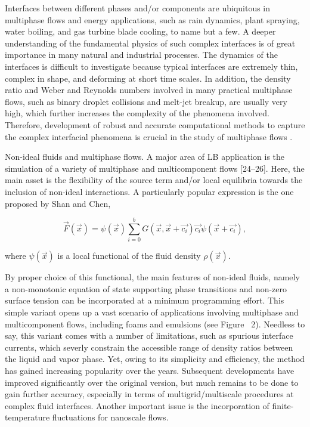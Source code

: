 Interfaces between different phases and/or components are ubiquitous in multiphase flows and energy applications, such as rain dynamics, plant spraying, water boiling, and gas turbine blade cooling, to name but a few. A deeper understanding of the fundamental physics of such complex interfaces is of great importance in many natural and industrial processes. The dynamics of the interfaces is difficult to investigate because typical interfaces are extremely thin, complex in shape, and deforming at short time scales. In addition, the density ratio and Weber and Reynolds numbers involved in many practical multiphase flows, such as binary droplet collisions and melt-jet breakup, are usually very high, which further increases the complexity of the phenomena involved. Therefore, development of robust and accurate computational methods to capture the complex interfacial phenomena is crucial in the study of multiphase flows \cite{feiModelingRealisticMultiphase2019}.

Non-ideal fluids and multiphase flows. 
A major area of LB application is the simulation of a variety of multiphase and multicomponent flows [24–26]. Here, the main asset is the flexibility of the source term and/or local equilibria towards the inclusion of non-ideal interactions. A particularly popular expression is the one proposed by Shan and Chen,

\begin{equation}
	\vec{F}(\vec{x}) = \psi(\vec{x}) \sum_{i=0}^{b}G(\vec{x},\vec{x}+\vec{c_i})\vec{c_i}\psi(\vec{x}+\vec{c_i}),
\end{equation}

where $\psi(\vec{x})$ is a local functional of the fluid density $\rho(\vec{x})$.

By proper choice of this functional, the main features of non-ideal fluids, namely a non-monotonic equation of state supporting phase transitions and non-zero surface tension can be incorporated at a minimum programming effort. This simple variant opens up a vast scenario of applications involving multiphase and multicomponent flows, including foams and emulsions (see Figure~ 2). Needless to say, this variant comes with a number of limitations, such as spurious interface currents, which severly constrain the accessible range of density ratios between the liquid and vapor phase. Yet, owing to its simplicity and efficiency, the method has gained increasing popularity over the years. Subsequent developments have improved significantly over the original version, but much remains to be done to gain further accuracy, especially in terms of multigrid/multiscale procedures at complex fluid interfaces. Another important issue is the incorporation of finite-temperature fluctuations for nanoscale flows.

